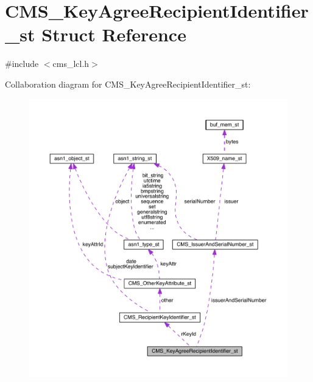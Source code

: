 \hypertarget{struct_c_m_s___key_agree_recipient_identifier__st}{}\section{C\+M\+S\+\_\+\+Key\+Agree\+Recipient\+Identifier\+\_\+st Struct Reference}
\label{struct_c_m_s___key_agree_recipient_identifier__st}


{\ttfamily \#include $<$cms\+\_\+lcl.\+h$>$}



Collaboration diagram for C\+M\+S\+\_\+\+Key\+Agree\+Recipient\+Identifier\+\_\+st\+:\nopagebreak
\begin{figure}[H]
\begin{center}
\leavevmode
\includegraphics[width=350pt]{struct_c_m_s___key_agree_recipient_identifier__st__coll__graph}
\end{center}
\end{figure}
